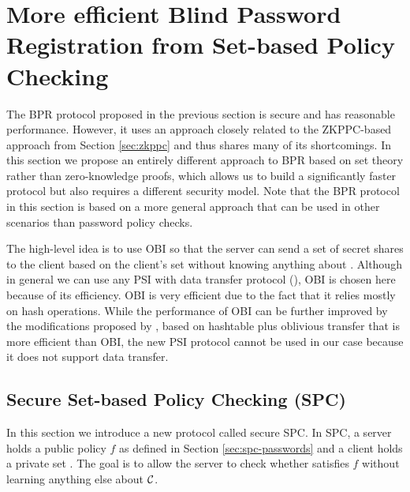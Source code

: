 \section[SPC-based BPR]{More efficient Blind Password Registration from Set-based Policy Checking}\label{sec:spc-bpr}

The \ac{BPR} protocol proposed in the previous section is secure and has reasonable performance.
However, it uses an approach closely related to the \ac{ZKPPC}-based approach from Section \ref{sec:zkppc} and thus shares many of its shortcomings.
In this section we propose an entirely different approach to \acl{BPR} based on set theory rather than zero-knowledge proofs, which allows us to build a significantly faster protocol but also requires a different security model.
Note that the \ac{BPR} protocol in this section is based on a more general approach that can be used in other scenarios than password policy checks.

The high-level idea is to use \ac{OBI} so that the server can send a set of secret shares to the client based on the client's set \cC without knowing anything about \cC. 
Although in general we can use any \ac{PSI} with data transfer protocol (\eg \citet{fre04}), \ac{OBI} is chosen here because of its efficiency. 
\ac{OBI} is very efficient due to the fact that it relies mostly on hash operations. 
While the performance of \ac{OBI} can be further improved by the modifications proposed by \citet{Pinkas0Z14}, based on hashtable plus oblivious transfer that is more efficient than \ac{OBI}, the new \ac{PSI} protocol cannot be used in our case because it does not support data transfer.

\subsection{Secure Set-based Policy Checking (SPC)} \label{sec:spc}
In this section we introduce a new protocol called secure \ac{SPC}. 
In \ac{SPC}, a server holds a public policy $f$ as defined in Section \ref{sec:spc-passwords} and a client holds a private set \cC. 
The goal is to allow the server to check whether \cC satisfies $f$ without learning anything else about $\mathcal{C}$. 

